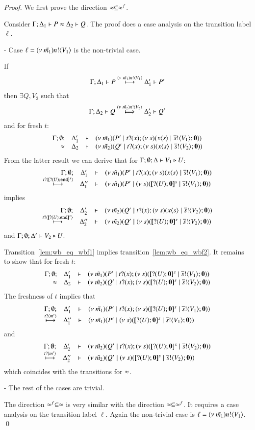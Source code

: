 \begin{proof}
	\noi We first prove the direction $\approx \subseteq \approx^{f}$.

	\noi Consider $\Gamma; \Delta_1 \vdash P \approx \Delta_2 \vdash Q$.
	The proof does a case analysis on the transition label $\ell$.

	\noi - Case $\ell = (\nu\ \tilde{m_1}) n ! \langle V_1 \rangle$ is the non-trivial case.

	\noi If
%
	\begin{eqnarray}
		\Gamma; \Delta_1 \vdash P \stackrel{(\nu\ \tilde{m_1}) n ! \langle V_1 \rangle}{\longmapsto} \Delta_1' \vdash P'
		\label{lem:wb_eq_wbf1}
	\end{eqnarray}
	then $\exists Q, V_2$ such that
%
	\begin{eqnarray}
		\horel{\Gamma}{\Delta_2}{Q}{\Hby{\news{\tilde{m_2}} \bactout{n}{V_2}}}{\Delta_2'}{Q'}
		\label{lem:wb_eq_wbf2}
	\end{eqnarray}
%
	and for fresh $t$:
	\[
		\begin{array}{rcll} \Gamma; \emptyset; &\Delta_1'& \vdash& (\nu\ \tilde{m_1})(P' \;|\; t ? (x) ; (\nu\ s)(x\langle s \rangle \;|\; \overline{s} ! \langle V_1 \rangle ; \mathbf{0}))\\ \approx &\Delta_2& \vdash &  (\nu\ \tilde{m_2})(Q' \;|\; t ? (x) ; (\nu\ s)(x\langle s \rangle \;|\; \overline{s} ! \langle V_2 \rangle ; \mathbf{0})) \end{array}
	\]
%
	From the latter result we can derive that for $\Gamma; \emptyset; \Delta \vdash V_1 \triangleright U$:
%
	\[
		\mhorel{\Gamma}{\Delta_1'}{\newsp{\tilde{m_1}}{P' \Par \hotrigger{t}{V_1}}}
		{\hby{\bactinp{t}{\map{\btinp{U} \tinact}^{x}}}}
		{\Delta_1''}{}{\newsp{\tilde{m_1}}{P' \Par \newsp{s}{\map{\btinp{U} \inact}^{s} \Par \bout{\dual{s}}{V_1} \inact}}}
	\]
%
	\noi implies
%
	\[
		\mhorel{\Gamma}{\Delta_2'}{\newsp{\tilde{m_2}}{Q' \Par \hotrigger{t}{V_2}}}
		{\hby{\bactinp{t}{\map{\btinp{U} \tinact}^{x}}}}
		{\Delta_2''}{}{\newsp{\tilde{m_2}}{Q' \Par \newsp{s}{\map{\btinp{U} \inact}^{s} \Par \bout{\dual{s}}{V_2} \inact}}}
	\]
%
	\noi and $\Gamma; \emptyset; \Delta' \vdash V_2 \triangleright U$.

	\noi Transition~\ref{lem:wb_eq_wbf1} implies transition~\ref{lem:wb_eq_wbf2}. It remains to
	show that for fresh $t$:
%
	\[
		\mhorel{\Gamma}{\Delta_1'}{\newsp{\tilde{m_1}}{P' \Par \fotrigger{t}{x}{s}{\btinp{U} \inact}{V_1}}}
		{\wb}
		{\Delta_2}{}{\newsp{\tilde{m_2}}{Q' \Par \fotrigger{t}{x}{s}{\btinp{U} \inact}{V_2}}}
	\]
%
	The freshness of $t$ implies that
	\[
		\mhorel{\Gamma}{\Delta_1'}{\newsp{\tilde{m_1}}{P' \Par \fotrigger{t}{x}{s}{\btinp{U} \inact}{V_1}}}
		{\hby{\bactinp{t}{m'}}}
		{\Delta_1''}{}{\newsp{\tilde{m_1}}{P' \Par \newsp{s}{\map{\btinp{U} \inact}^{s} \Par \bout{\dual{s}}{V_1} \inact}}}
	\]
	\noi and
%
	\[
		\mhorel{\Gamma}{\Delta_2'}{\newsp{\tilde{m_2}}{Q' \Par \fotrigger{t}{x}{s}{\btinp{U} \inact}{V_2}}}
		{\hby{\bactinp{t}{m'}}}
		{\Delta_2''}{}{\newsp{\tilde{m_2}}{Q' \Par \newsp{s}{\map{\btinp{U} \inact}^{s} \Par \bout{\dual{s}}{V_2} \inact}}}
	\]
%
	\noi which coincides with the transitions for $\approx$.

	\noi - The rest of the cases are trivial.

	\noi The direction $\approx^{f} \subseteq \approx$ is very similar with the
	direction $\approx \subseteq \approx^{f}$. It requires a case analysis
	on the transition label $\ell$. Again the non-trivial case is
	$\ell = (\nu\ \tilde{m_1}) n ! \langle V_1 \rangle$.
	\qed
\end{proof}


